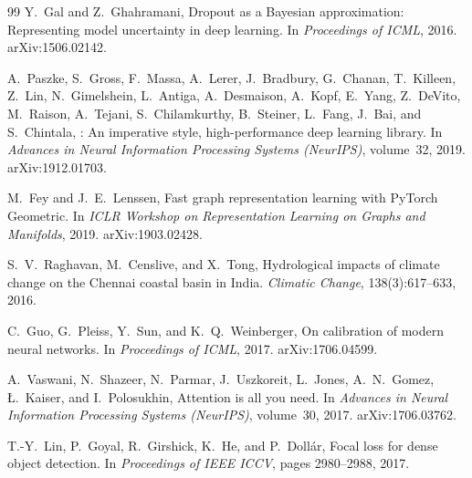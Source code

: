 \documentclass[10pt,twocolumn]{article}
\begin{document}
\begin{thebibliography}{99}
Y.~Gal and Z.~Ghahramani,
\newblock Dropout as a Bayesian approximation: Representing model uncertainty
  in deep learning.
\newblock In \emph{Proceedings of ICML}, 2016.
\newblock arXiv:1506.02142.

A.~Paszke, S.~Gross, F.~Massa, A.~Lerer, J.~Bradbury, G.~Chanan, T.~Killeen,
  Z.~Lin, N.~Gimelshein, L.~Antiga, A.~Desmaison, A.~Kopf, E.~Yang,
  Z.~DeVito, M.~Raison, A.~Tejani, S.~Chilamkurthy, B.~Steiner, L.~Fang,
  J.~Bai, and S.~Chintala,
: An imperative style, high-performance deep learning
  library.
\newblock In \emph{Advances in Neural Information Processing Systems (NeurIPS)},
  volume~32, 2019.
\newblock arXiv:1912.01703.

M.~Fey and J.~E.~Lenssen,
\newblock Fast graph representation learning with {PyTorch Geometric}.
\newblock In \emph{ICLR Workshop on Representation Learning on Graphs and
  Manifolds}, 2019.
\newblock arXiv:1903.02428.

S.~V.~Raghavan, M.~Censlive, and X.~Tong,
\newblock Hydrological impacts of climate change on the Chennai coastal basin
  in India.
\newblock \emph{Climatic Change}, 138(3):617--633, 2016.
\newblock {}

C.~Guo, G.~Pleiss, Y.~Sun, and K.~Q.~Weinberger,
\newblock On calibration of modern neural networks.
\newblock In \emph{Proceedings of ICML}, 2017.
\newblock arXiv:1706.04599.

A.~Vaswani, N.~Shazeer, N.~Parmar, J.~Uszkoreit, L.~Jones, A.~N.~Gomez,
  {\L}.~Kaiser, and I.~Polosukhin,
\newblock Attention is all you need.
\newblock In \emph{Advances in Neural Information Processing Systems (NeurIPS)},
  volume~30, 2017.
\newblock arXiv:1706.03762.

T.-Y.~Lin, P.~Goyal, R.~Girshick, K.~He, and P.~Doll\'{a}r,
\newblock Focal loss for dense object detection.
\newblock In \emph{Proceedings of IEEE ICCV}, pages 2980--2988, 2017.
\newblock {}

\end{thebibliography}
\end{document}
